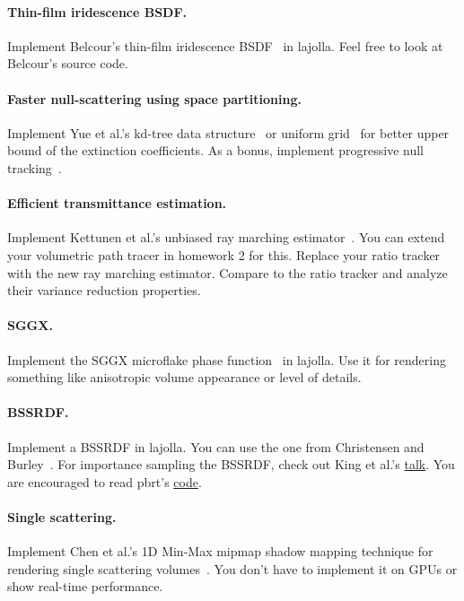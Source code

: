 \paragraph{Thin-film iridescence BSDF.}
Implement Belcour's thin-film iridescence BSDF~\cite{Belcour:2017:PEM} in lajolla.
Feel free to look at Belcour's source code.

\paragraph{Faster null-scattering using space partitioning.}
Implement Yue et al.'s kd-tree data structure~\cite{Yue:2010:UAS} or uniform grid~\cite{Yue:2011:TOS} for better upper bound of the extinction coefficients. As a bonus, implement progressive null tracking~\cite{Misso:2023:PNT}. 

\paragraph{Efficient transmittance estimation.}
Implement Kettunen et al.'s unbiased ray marching estimator~\cite{Kettunen:2021:URT}.
You can extend your volumetric path tracer in homework 2 for this.
Replace your ratio tracker with the new ray marching estimator.
Compare to the ratio tracker and analyze their variance reduction properties.

\paragraph{SGGX.}
Implement the SGGX microflake phase function~\cite{Heitz:2015:SMD} in lajolla. Use it for rendering something like anisotropic volume appearance or level of details.

\paragraph{BSSRDF.}
Implement a BSSRDF in lajolla.
You can use the one from Christensen and Burley~\cite{Christensen:2015:ARP}.
For importance sampling the BSSRDF, check out King et al.'s \href{https://pdfs.semanticscholar.org/90da/5211ce2a6f63d50b8616736c393aaf8bf4ca.pdf}{talk}.
You are encouraged to read pbrt's \href{https://www.pbr-book.org/3ed-2018/Light_Transport_II_Volume_Rendering/Sampling_Subsurface_Reflection_Functions}{code}.

\paragraph{Single scattering.}
Implement Chen et al.'s 1D Min-Max mipmap shadow mapping technique for rendering single scattering volumes~\cite{Chen:2011:RVS}.
You don't have to implement it on GPUs or show real-time performance.

